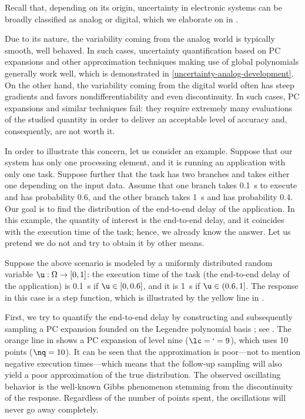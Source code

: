 Recall that, depending on its origin, uncertainty in electronic systems can be
broadly classified as analog or digital, which we elaborate on in
.

Due to its nature, the variability coming from the analog world is typically
smooth, well behaved. In such cases, uncertainty quantification based on \ac{PC}
expansions \cite{xiu2010} and other approximation techniques making use of
global polynomials generally work well, which is demonstrated in
\cref{uncertainty-analog-development}. On the other hand, the variability coming
from the digital world often has steep gradients and favors nondifferentiability
and even discontinuity. In such cases, \ac{PC} expansions and similar techniques
fail: they require extremely many evaluations of the studied quantity in order
to deliver an acceptable level of accuracy and, consequently, are not worth it.

In order to illustrate this concern, let us consider an example. Suppose that
our system has only one processing element, and it is running an application
with only one task. Suppose further that the task has two branches and takes
either one depending on the input data. Assume that one branch takes 0.1~s to
execute and has probability 0.6, and the other branch takes 1~s and has
probability 0.4. Our goal is to find the distribution of the end-to-end delay of
the application. In this example, the quantity of interest is the end-to-end
delay, and it coincides with the execution time of the task; hence, we already
know the answer. Let us pretend we do not and try to obtain it by other means.

Suppose the above scenario is modeled by a uniformly distributed random variable
$\u: \Omega \to [0, 1]$: the execution time of the task (the end-to-end delay of
the application) is 0.1~s if $\u \in [0, 0.6]$, and it is 1~s if $\u \in (0.6,
1]$. The response in this case is a step function, which is illustrated by the
yellow line in .

First, we try to quantify the end-to-end delay by constructing and subsequently
sampling a \ac{PC} expansion founded on the Legendre polynomial basis
\cite{xiu2010}; see . The orange line in
 shows a \ac{PC} expansion of level nine ($\lc =
\lq = 9$), which uses 10 points ($\nq = 10$). It can be seen that the
approximation is poor---not to mention negative execution times---which means
that the follow-up sampling will also yield a poor approximation of the true
distribution. The observed oscillating behavior is the well-known Gibbs
phenomenon stemming from the discontinuity of the response. Regardless of the
number of points spent, the oscillations will never go away completely.

